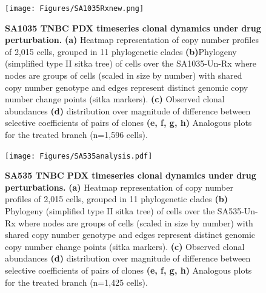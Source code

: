 \begin{figure}
\centering
\texttt{[image: Figures/SA1035Rxnew.png]}
	
\caption[SA1035 TNBC PDX timeseries clonal dynamics under drug perturbation]
	{\small
	\textbf{SA1035 TNBC PDX timeseries clonal dynamics under drug perturbation.}
	    \textbf{(a)} Heatmap representation of copy number profiles of
2,015 cells, grouped in 11 phylogenetic clades  \textbf{(b)}Phylogeny (simplified type II sitka tree) of cells over the SA1035-Un-Rx where nodes are groups of cells (scaled in size by number) with shared copy number genotype and edges represent distinct genomic copy number change points (sitka markers). \textbf{(c)} Observed clonal abundances \textbf{(d)} distribution over magnitude of difference between selective coefficients of pairs of clones \textbf{(e, f, g, h)} Analogous plots for the treated branch (n=1,596 cells).
	}
	\label{fig:SA1035Rxnew}
\end{figure}



\begin{figure}
\centering
\texttt{[image: Figures/SA535analysis.pdf]}
	
\caption[SA535 TNBC PDX timeseries clonal dynamics under drug perturbations]
	{\small
	\textbf{SA535 TNBC PDX timeseries clonal dynamics under drug perturbations.}
	     \textbf{(a)} Heatmap representation of copy number profiles of
2,015 cells, grouped in 11 phylogenetic clades  \textbf{(b)} Phylogeny (simplified type II sitka tree) of cells over the SA535-Un-Rx where nodes are groups of cells (scaled in size by number) with shared copy number genotype and edges represent distinct genomic copy number change points (sitka markers). \textbf{(c)} Observed clonal abundances \textbf{(d)} distribution over magnitude of difference between selective coefficients of pairs of clones \textbf{(e, f, g, h)} Analogous plots for the treated branch (n=1,425 cells).
	}
	\label{fig:SA535analysis}
\end{figure}


